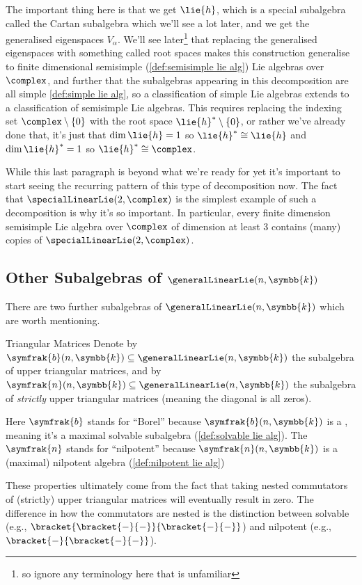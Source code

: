 \documentclass[fleqn]{NotesClass}
\renewcommand{\field}{\symbb{k}}
\newcommand{\isomorphic}{\cong}
\newcommand{\borelLie}{\symfrak{b}}
\newcommand{\nilpotentLie}{\symfrak{n}}
\begin{document}
    The important thing here is that we get \(\lie{h}\), which is a special subalgebra called the Cartan subalgebra which we'll see a lot later, and we get the generalised eigenspaces \(V_{\alpha}\).
    We'll see later\footnote{so ignore any terminology here that is unfamiliar} that replacing the generalised eigenspaces with something called root spaces makes this construction generalise to finite dimensional semisimple (\cref{def:semisimple lie alg}) Lie algebras over \(\complex\), and further that the subalgebras appearing in this decomposition are all simple \cref{def:simple lie alg}, so a classification of simple Lie algebras extends to a classification of semisimple Lie algebras.
    This requires replacing the indexing set \(\complex \setminus \{0\}\) with the root space \(\lie{h}^* \setminus \{0\}\), or rather we've already done that, it's just that \(\dim \lie{h} = 1\) so \(\lie{h}^* \isomorphic \lie{h}\) and \(\dim \lie{h}^* = 1\) so \(\lie{h}^* \isomorphic \complex\).
    
    While this last paragraph is beyond what we're ready for yet it's important to start seeing the recurring pattern of this type of decomposition now.
    The fact that \(\specialLinearLie(2, \complex)\) is the simplest example of such a decomposition is why it's so important.
    In particular, every finite dimension semisimple Lie algebra over \(\complex\) of dimension at least 3 contains (many) copies of \(\specialLinearLie(2, \complex)\).
    
    \subsection{Other Subalgebras of \texorpdfstring{\(\generalLinearLie(n, \field)\)}{gl(n, k)}}
    There are two further subalgebras of \(\generalLinearLie(n, \field)\) which are worth mentioning.
    \begin{dfn}{Triangular Matrices}{}
        Denote by \(\borelLie(n, \field) \subseteq \generalLinearLie(n, \field)\) the subalgebra of upper triangular matrices, and by \(\nilpotentLie(n, \field) \subseteq \generalLinearLie(n, \field)\) the subalgebra of \emph{strictly} upper triangular matrices (meaning the diagonal is all zeros).
    \end{dfn}
    
    \begin{remark}{}{}
        Here \(\borelLie\) stands for \enquote{Borel} because \(\borelLie(n, \field)\) is a , meaning it's a maximal solvable subalgebra (\cref{def:solvable lie alg}).
        The \(\nilpotentLie\) stands for \enquote{nilpotent} because \(\nilpotentLie(n, \field)\) is a (maximal) nilpotent algebra (\cref{def:nilpotent lie alg})
        
        These properties ultimately come from the fact that taking nested commutators of (strictly) upper triangular matrices will eventually result in zero.
        The difference in how the commutators are nested is the distinction between solvable (e.g., \(\bracket{\bracket{-}{-}}{\bracket{-}{-}}\)) and nilpotent (e.g., \(\bracket{-}{\bracket{-}{-}}\)).
    \end{remark}
    
\end{document}
